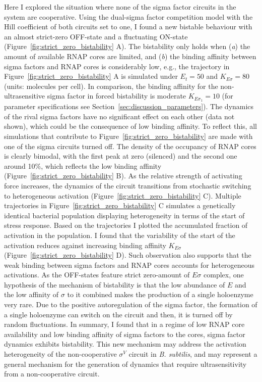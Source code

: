 Here I explored the situation where none of the sigma factor circuits
in the system are cooperative.
Using the dual-sigma factor competition model with the Hill coefficient
of both circuits set to one, I found a new bistable behaviour with
an almost strict-zero OFF-state and a fluctuating ON-state
(Figure~\ref{fig:strict_zero_bistability} A).
The bistability only holds when (\textit{a}) the amount of available
RNAP cores are limited, and (\textit{b}) the binding affinity between
sigma factors and RNAP cores is considerably low,
e.g., the trajectory in Figure~\ref{fig:strict_zero_bistability} A is 
simulated under $E_t = 50$ and $K_{E\sigma} = 80$
(units: molecules per cell).
In comparison, the binding affinity for the non-ultrasensitive sigma
factor in forced bistability is moderate $K_{E\sigma_1} = 10$
(for parameter specifications see Section~\ref{sec:discussion_parameters}).
The dynamics of the rival sigma factors have no significant effect
on each other (data not shown), which could be the consequence
of low binding affinity.
To reflect this, all simulations that contribute to 
Figure~\ref{fig:strict_zero_bistability} are made with one of the 
sigma circuits turned off.
The density of the occupancy of RNAP cores is clearly bimodal,
with the first peak at zero (silenced) and the second one
around 10\%, which reflects the low binding affinity
(Figure~\ref{fig:strict_zero_bistability} B).
As the relative strength of activating force increases,
the dynamics of the circuit transitions from stochastic switching
to heterogeneous activation (Figure~\ref{fig:strict_zero_bistability} C).
Multiple trajectories in Figure~\ref{fig:strict_zero_bistability} C
simulates a genetically identical bacterial population displaying
heterogeneity in terms of the start of stress response.
Based on the trajectories I plotted the accumulated fraction of
activation in the population.
I found that the variability of
the start of the activation reduces against increasing binding
affinity $K_{E\sigma}$ (Figure~\ref{fig:strict_zero_bistability} D).
Such observation also supports that the weak binding between
sigma factors and RNAP cores accounts for heterogeneous activations.
As the OFF-states feature strict zero-amount of $E\sigma$ complex,
one hypothesis of the mechanism of bistability is that
the low abundance of $E$ and the low affinity of $\sigma$ to it
combined makes the production of a single holoenzyme very rare.
Due to the positive autoregulation of the sigma factor,
the formation of a single holoenzyme can switch on the circuit and
then, it is turned off by random fluctuations.
In summary, I found that in a regime of low RNAP core availability
and low binding affinity of sigma factors to the cores,
sigma factor dynamics exhibits bistability.
This new mechanism may address the activation heterogeneity
of the non-cooperative $\sigma^V$ circuit in \textit{B. subtilis},
and may represent a general mechanism for the generation of 
dynamics that require ultrasensitivity from a non-cooperative circuit.

